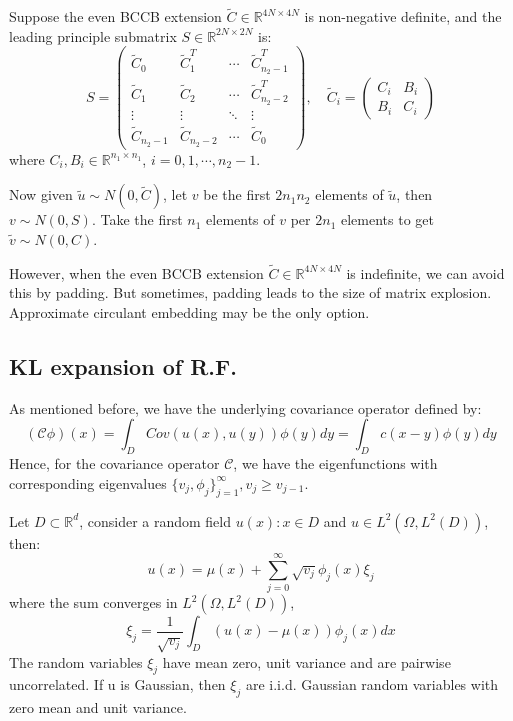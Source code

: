 \begin{algorithm}
    Suppose the even BCCB extension $\tilde{C}\in \mathbb{R}^{4N\times 4N}$ is non-negative definite, and the leading principle submatrix $S\in \mathbb{R}^{2N\times 2N}$ is:
    \begin{equation}
        S = \begin{pmatrix}
            \tilde{C}_0 & \tilde{C}_1^T & \cdots & \tilde{C}_{n_2-1}^T\\
            \tilde{C}_1 & \tilde{C}_2 & \cdots & \tilde{C}_{n_2-2}^T\\
            \vdots & \vdots & \ddots & \vdots\\
            \tilde{C}_{n_2-1} & \tilde{C}_{n_2-2} & \cdots & \tilde{C}_0
        \end{pmatrix},\quad \tilde{C}_i = \begin{pmatrix}
            C_i & B_i\\
            B_i & C_i
        \end{pmatrix}
    \end{equation}
    where $C_i, B_i \in \mathbb{R}^{n_1\times n_1}$, $i = 0, 1, \cdots, n_2-1$. 
    
    Now given $\tilde{u}\sim N(0, \tilde{C})$, let $v$ be the first $2n_1n_2$ elements of $\tilde{u}$, 
    then $v\sim N(0, S)$. Take the first $n_1$ elements of $v$ per $2n_1$ elements to get $\tilde{v}\sim N(0, C)$.
\end{algorithm}

However, when the even BCCB extension $\tilde{C}\in \mathbb{R}^{4N\times 4N}$ is indefinite, we can avoid this by padding. 
But sometimes, padding leads to the size of matrix explosion. Approximate circulant embedding may be the only option.

\subsection{KL expansion of R.F.}
As mentioned before, we have the underlying covariance operator defined by:
\begin{equation}
    (\mathscr{C}\phi)(x) = \int_D Cov(u(x), u(y))\phi(y)dy=\int_D c(x-y)\phi(y)dy
\end{equation}
Hence, for the covariance operator $\mathscr{C}$, we have the eigenfunctions with corresponding eigenvalues $\{v_j, \phi_j\}_{j=1}^{\infty}, v_j\geq v_{j-1}$.
\begin{theorem}
    Let $D\subset \mathbb{R}^d$, consider a random field $u(x): x\in D$ and $u\in L^2(\Omega, L^2(D))$, then:
    \begin{equation}
        u(x) = \mu(x) + \sum_{j=0}^{\infty} \sqrt{v_j} \phi_j(x) \xi_j
    \end{equation}
    where the sum converges in $L^2(\Omega, L^2(D))$, 
    \begin{equation}
        \xi_j = \frac{1}{\sqrt{v_j}}\int_D (u(x)-\mu(x))\phi_j(x)dx
    \end{equation}
    The random variables $\xi_j$ have mean zero, unit variance and are pairwise uncorrelated.
    If u is Gaussian, then $\xi_j$ are i.i.d. Gaussian random variables with zero mean and unit variance.
\end{theorem}
